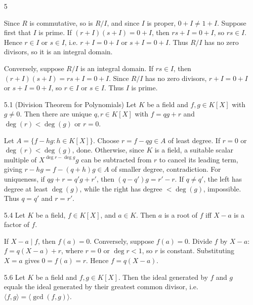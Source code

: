 \documentclass[8pt]{extarticle}
\makeatletter
\renewenvironment{proof}[1][\proofname]{%
  \par%
  \pushQED{\qed}%
  \normalfont
  \topsep=2pt\partopsep=0pt\parsep=0pt\itemsep=0pt%
  \trivlist
  \item[\hskip\labelsep\itshape #1\@addpunct{.}]\ignorespaces
}{%
  \popQED\endtrivlist\@endpefalse
  \vspace{-1pt}%
}
\makeatother
\begin{document}
\begin{multicols*}{5}
        \begin{proof}
            Since \(R\) is commutative, so is \(R/I\), and since \(I\) is proper, \(0+I\ne1+I\). Suppose first that \(I\) is prime. If \((r+I)(s+I)=0+I\), then \(rs+I=0+I\), so \(rs\in I\). Hence \(r\in I\) or \(s\in I\), i.e. \(r+I=0+I\) or \(s+I=0+I\). Thus \(R/I\) has no zero divisors, so it is an integral domain.

            Conversely, suppose \(R/I\) is an integral domain. If \(rs\in I\), then \((r+I)(s+I)=rs+I=0+I\). Since \(R/I\) has no zero divisors, \(r+I=0+I\) or \(s+I=0+I\), so \(r\in I\) or \(s\in I\). Thus \(I\) is prime.
        \end{proof}

        \begin{theorem}{5.1}
            (Division Theorem for Polynomials) Let \(K\) be a field and \(f,g\in K[X]\) with \(g\ne0\). Then there are unique \(q,r\in K[X]\) with \(f=qg+r\) and \(\deg(r)<\deg(g)\) or \(r=0\).
        \end{theorem}

        \begin{proof}
            Let \(A=\{f-hg:h\in K[X]\}\). Choose \(r=f-qg\in A\) of least degree. If \(r=0\) or \(\deg(r)<\deg(g)\), done. Otherwise, since \(K\) is a field, a suitable scalar multiple of \(X^{\deg r-\deg g}g\) can be subtracted from \(r\) to cancel its leading term, giving \(r-hg=f-(q+h)g\in A\) of smaller degree, contradiction. For uniqueness, if \(qg+r=q'g+r'\), then \((q-q')g=r'-r\). If \(q\ne q'\), the left has degree at least \(\deg(g)\), while the right has degree \(<\deg(g)\), impossible. Thus \(q=q'\) and \(r=r'\).
        \end{proof}

        \begin{corollary}{5.4}
            Let \(K\) be a field, \(f\in K[X]\), and \(a\in K\). Then \(a\) is a root of \(f\) iff \(X-a\) is a factor of \(f\).
        \end{corollary}

        \begin{proof}
            If \(X-a\mid f\), then \(f(a)=0\). Conversely, suppose \(f(a)=0\). Divide \(f\) by \(X-a\): \(f=q(X-a)+r\), where \(r=0\) or \(\deg r<1\), so \(r\) is constant. Substituting \(X=a\) gives \(0=f(a)=r\). Hence \(f=q(X-a)\).
        \end{proof}

        \begin{corollary}{5.6}
            Let \(K\) be a field and \(f,g\in K[X]\). Then the ideal generated by \(f\) and \(g\) equals the ideal generated by their greatest common divisor, i.e. \(\langle f,g\rangle=\langle\gcd(f,g)\rangle\).
        \end{corollary}


\end{multicols*}
\end{document}
